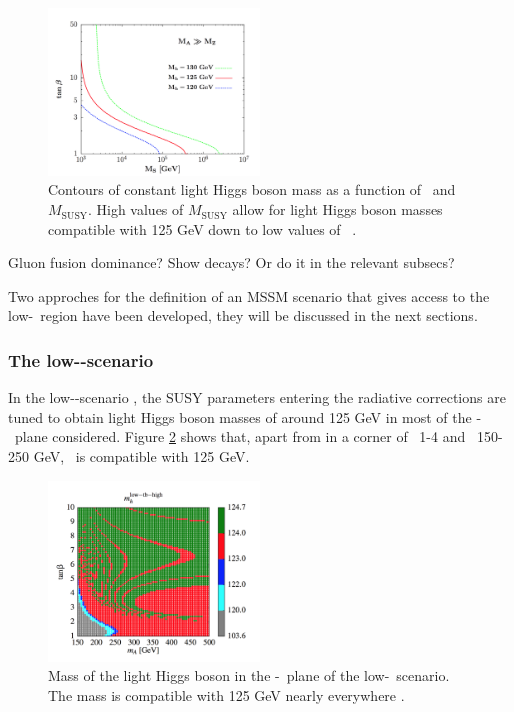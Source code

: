 \begin{figure}[h!]
\begin{center}
\includegraphics[width=0.5\textwidth]{./Theory/Figures/tanb_accessibility.png}
\end{center}
\caption{Contours of constant light Higgs boson mass as a function of \tanb~and $M_{\text{SUSY}}$.
High values of $M_{\text{SUSY}}$ allow for light Higgs boson masses compatible with
125 GeV down to low values of \tanb~\cite{hMSSM-2}.}
\label{fig:tanb_accessibility}
\end{figure}


Gluon fusion dominance? Show decays? Or do it in the relevant subsecs?

Two approches for the definition of an MSSM scenario that gives
access to the low-\tanb~region have been developed, they will be
discussed in the next sections.

\subsubsection{The low-\tanb-scenario}
\label{sec:theory_BSM_model_lowtb}
In the low-\tanb-scenario \cite{Hein-low-tb-high,MSSM-lowtanb}, the SUSY parameters entering
the radiative corrections are tuned to obtain light 
Higgs boson masses of around 125 GeV in most of the \mA-\tanb~plane considered.
Figure \ref{fig:lowtbhigh_mh} shows that, apart from in a corner of \tanb~1-4 and 
\mA~150-250 GeV, \mh~is compatible with 125 GeV.

\begin{figure}[h!]
\begin{center}
\includegraphics[width=0.5\textwidth]{./Theory/Figures/mh_lowtbhigh.png}
\end{center}
\caption{Mass of the light Higgs boson in the \mA-\tanb~plane of the low-\tanb~scenario.
The mass is compatible with 125 GeV nearly everywhere \cite{MSSM-lowtanb}.}
\label{fig:lowtbhigh_mh}
\end{figure}

